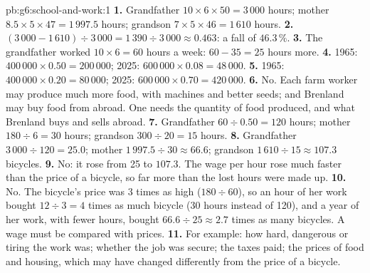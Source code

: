 \begin{solution}{pb:g6:school-and-work:1}
\textbf{1.} Grandfather $10 \times 6 \times 50 = 3\,000$ hours; mother $8.5 \times 5
\times 47 = 1\,997.5$ hours; grandson $7 \times 5 \times 46 = 1\,610$ hours.
\textbf{2.} $(3\,000 - 1\,610) \div 3\,000 = 1\,390 \div 3\,000 \approx 0.463$: a fall
of $46.3\,\%$.
\textbf{3.} The grandfather worked $10 \times 6 = 60$ hours a week: $60 - 35 = 25$
hours more.
\textbf{4.} 1965: $400\,000 \times 0.50 = 200\,000$; 2025: $600\,000 \times 0.08 =
48\,000$.
\textbf{5.} 1965: $400\,000 \times 0.20 = 80\,000$; 2025: $600\,000 \times 0.70 =
420\,000$.
\textbf{6.} No. Each farm worker may produce much more food, with machines and
better seeds; and Brenland may buy food from abroad. One needs the quantity of
food produced, and what Brenland buys and sells abroad.
\textbf{7.} Grandfather $60 \div 0.50 = 120$ hours; mother $180 \div 6 = 30$ hours;
grandson $300 \div 20 = 15$ hours.
\textbf{8.} Grandfather $3\,000 \div 120 = 25.0$; mother $1\,997.5 \div 30 \approx
66.6$; grandson $1\,610 \div 15 \approx 107.3$ bicycles.
\textbf{9.} No: it rose from 25 to $107.3$. The wage per hour rose much faster than
the price of a bicycle, so far more than the lost hours were made up.
\textbf{10.} No. The bicycle's price was 3 times as high ($180 \div 60$), so an hour
of her work bought $12 \div 3 = 4$ times as much bicycle (30 hours instead of 120),
and a year of her work, with fewer hours, bought $66.6 \div 25 \approx 2.7$ times
as many bicycles. A wage must be compared with prices.
\textbf{11.} For example: how hard, dangerous or tiring the work was; whether the
job was secure; the taxes paid; the prices of food and housing, which may have
changed differently from the price of a bicycle.
\end{solution}
